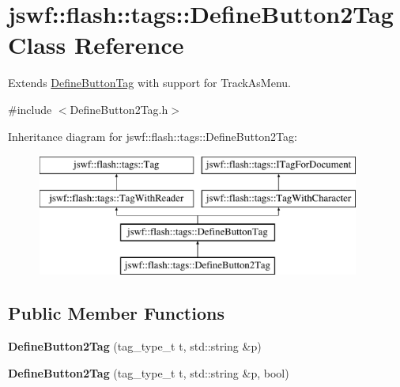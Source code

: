\hypertarget{classjswf_1_1flash_1_1tags_1_1_define_button2_tag}{\section{jswf\+:\+:flash\+:\+:tags\+:\+:Define\+Button2\+Tag Class Reference}
\label{classjswf_1_1flash_1_1tags_1_1_define_button2_tag}
}


Extends \hyperlink{classjswf_1_1flash_1_1tags_1_1_define_button_tag}{Define\+Button\+Tag} with support for {\ttfamily Track\+As\+Menu}.  




{\ttfamily \#include $<$Define\+Button2\+Tag.\+h$>$}

Inheritance diagram for jswf\+:\+:flash\+:\+:tags\+:\+:Define\+Button2\+Tag\+:\begin{figure}[H]
\begin{center}
\leavevmode
\includegraphics[height=4.000000cm]{classjswf_1_1flash_1_1tags_1_1_define_button2_tag}
\end{center}
\end{figure}
\subsection*{Public Member Functions}
\begin{DoxyCompactItemize}
\item 
\hypertarget{classjswf_1_1flash_1_1tags_1_1_define_button2_tag_ac7600948149376eb293d3064a93b5bf7}{{\bfseries Define\+Button2\+Tag} (tag\+\_\+type\+\_\+t t, std\+::string \&p)}\label{classjswf_1_1flash_1_1tags_1_1_define_button2_tag_ac7600948149376eb293d3064a93b5bf7}

\item 
\hypertarget{classjswf_1_1flash_1_1tags_1_1_define_button2_tag_ae8ae0893da19eab72e3ec3ec35048d98}{{\bfseries Define\+Button2\+Tag} (tag\+\_\+type\+\_\+t t, std\+::string \&p, bool)}\label{classjswf_1_1flash_1_1tags_1_1_define_button2_tag_ae8ae0893da19eab72e3ec3ec35048d98}

\end{DoxyCompactItemize}
